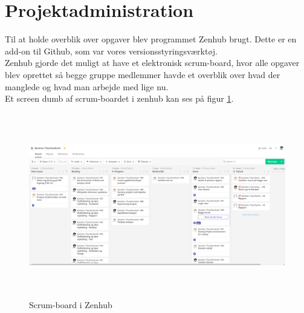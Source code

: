 \section{Projektadministration}
Til at holde overblik over opgaver blev programmet Zenhub brugt. Dette er en add-on til Github, som var vores versionsstyringsværktøj. \\
Zenhub gjorde det muligt at have et elektronisk scrum-board, hvor alle opgaver blev oprettet så begge gruppe medlemmer havde et overblik over hvad der manglede og hvad man arbejde med lige nu. \\
Et screen dumb af scrum-boardet i zenhub kan ses på figur \ref{fig:ZenhubScrum}.

\begin{figure} [H]
	\begin{center}
		\includegraphics[height=8cm, width=15cm]{Projektadministration/Zenhub}
	\end{center}
	\caption{Scrum-board i Zenhub}
	\label{fig:ZenhubScrum}
\end{figure} 
